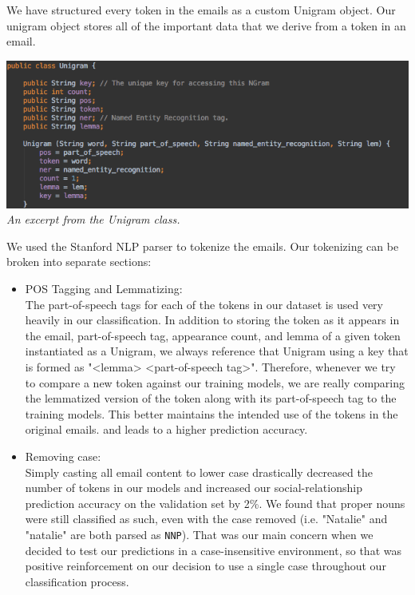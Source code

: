 \documentclass{article} %
\begin{document}
We have structured every token in the emails as a custom Unigram object. Our unigram object stores all of the important data that we derive from a token in an email.\\
\begin{center}
\includegraphics[width=1.0\textwidth]{images/unigram.png}
\textit{An excerpt from the Unigram class.}
\end{center}
We used the Stanford NLP parser to tokenize the emails. Our tokenizing can be broken into separate sections:\\
\begin{itemize}
\item POS Tagging and Lemmatizing:\\
The part-of-speech tags for each of the tokens in our dataset is used very heavily in our classification. In addition to storing the token as it appears in the email, part-of-speech tag, appearance count, and lemma of a given token instantiated as a Unigram, we always reference that Unigram using a key that is formed as "<lemma> <part-of-speech tag>". Therefore, whenever we try to compare a new token against our training models, we are really comparing the lemmatized version of the token along with its part-of-speech tag to the training models. This better maintains the intended use of the tokens in the original emails. and leads to a higher prediction accuracy.
\item Removing case:\\
Simply casting all email content to lower case drastically decreased the number of tokens in our models and increased our social-relationship prediction accuracy on the validation set by 2\%. We found that proper nouns were still classified as such, even with the case removed (i.e. "Natalie" and "natalie" are both parsed as \texttt{NNP}). That was our main concern when we decided to test our predictions in a case-insensitive environment, so that was positive reinforcement on our decision to use a single case throughout our classification process.
\end{itemize}
\end{document}
